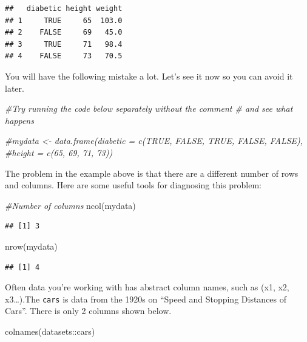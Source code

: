 \documentclass[
]{book}
\newenvironment{Shaded}{\begin{snugshade}}{\end{snugshade}}
\newcommand{\CommentTok}[1]{\textcolor[rgb]{0.56,0.35,0.01}{\textit{#1}}}
\newcommand{\FunctionTok}[1]{\textcolor[rgb]{0.00,0.00,0.00}{#1}}
\newcommand{\NormalTok}[1]{#1}
\newcommand{\SpecialCharTok}[1]{\textcolor[rgb]{0.00,0.00,0.00}{#1}}
\theoremstyle{definition}
\theoremstyle{definition}
\theoremstyle{definition}
\theoremstyle{definition}
\theoremstyle{remark}
\begin{document}
\begin{verbatim}
##   diabetic height weight
## 1     TRUE     65  103.0
## 2    FALSE     69   45.0
## 3     TRUE     71   98.4
## 4    FALSE     73   70.5
\end{verbatim}

You will have the following mistake a lot. Let's see it now so you can avoid it later.

\begin{Shaded}
\begin{Highlighting}[]
\CommentTok{\#Try running the code below separately without the comment \# and see what happens}

\CommentTok{\#mydata \textless{}{-} data.frame(diabetic = c(TRUE, FALSE, TRUE, FALSE, FALSE), }
                     \CommentTok{\#height = c(65, 69, 71, 73))}
\end{Highlighting}
\end{Shaded}

The problem in the example above is that there are a different number of rows and columns. Here are some useful tools for diagnosing this problem:

\begin{Shaded}
\begin{Highlighting}[]
\CommentTok{\#Number of columns}
\FunctionTok{ncol}\NormalTok{(mydata)}
\end{Highlighting}
\end{Shaded}

\begin{verbatim}
## [1] 3
\end{verbatim}

\begin{Shaded}
\begin{Highlighting}[]
\FunctionTok{nrow}\NormalTok{(mydata)}
\end{Highlighting}
\end{Shaded}

\begin{verbatim}
## [1] 4
\end{verbatim}

Often data you're working with has abstract column names, such as (x1, x2, x3\ldots).The \texttt{cars} is data from the 1920s on ``Speed and Stopping Distances of Cars''. There is only 2 columns shown below.

\begin{Shaded}
\begin{Highlighting}[]
\FunctionTok{colnames}\NormalTok{(datasets}\SpecialCharTok{::}\NormalTok{cars)}
\end{Highlighting}
\end{Shaded}
\end{document}
